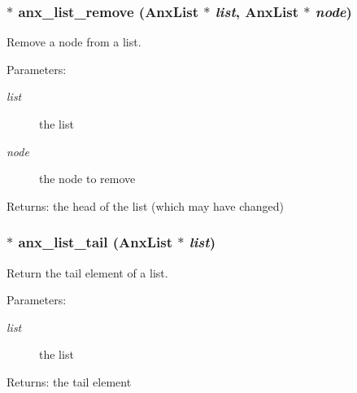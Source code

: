 \subsubsection{$\ast$ anx\_\-list\_\-remove ({\bf Anx\-List} $\ast$ {\em list}, {\bf Anx\-List} $\ast$ {\em node})}\label{anx__list_8h_a10}


Remove a node from a list. 

\begin{Desc}
\item[Parameters:]
\begin{description}
\item[{\em list}]the list \item[{\em node}]the node to remove \end{description}
\end{Desc}
\begin{Desc}
\item[Returns:]the head of the list (which may have changed) \end{Desc}
\subsubsection{$\ast$ anx\_\-list\_\-tail ({\bf Anx\-List} $\ast$ {\em list})}\label{anx__list_8h_a4}


Return the tail element of a list. 

\begin{Desc}
\item[Parameters:]
\begin{description}
\item[{\em list}]the list \end{description}
\end{Desc}
\begin{Desc}
\item[Returns:]the tail element \end{Desc}
